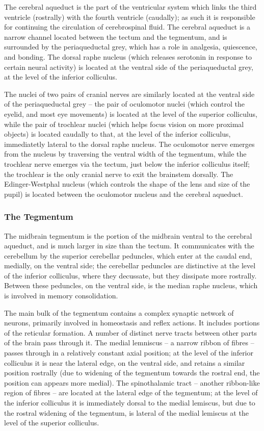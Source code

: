 The cerebral aqueduct is the part of the ventricular system which links the third ventricle (rostrally) with the fourth ventricle (caudally); as such it is responsible for continuing the circulation of cerebrospinal fluid. The cerebral aqueduct is a narrow channel located between the tectum and the tegmentum, and is surrounded by the periaqueductal grey, which has a role in analgesia, quiescence, and bonding. The dorsal raphe nucleus (which releases serotonin in response to certain neural activity) is located at the ventral side of the periaqueductal grey, at the level of the inferior colliculus.

The nuclei of two pairs of cranial nerves are similarly located at the ventral side of the periaqueductal grey -- the pair of oculomotor nuclei (which control the eyelid, and most eye movements) is located at the level of the superior colliculus, while the pair of trochlear nuclei (which helps focus vision on more proximal objects) is located caudally to that, at the level of the inferior colliculus, immediatetly lateral to the dorsal raphe nucleus. The oculomotor nerve emerges from the nucleus by traversing the ventral width of the tegmentum, while the trochlear nerve emerges via the tectum, just below the inferior colliculus itself; the trochlear is the only cranial nerve to exit the brainstem dorsally. The Edinger-Westphal nucleus (which controls the shape of the lens and size of the pupil) is located between the oculomotor nucleus and the cerebral aqueduct.

\hypertarget{the-tegmentum}{%
\subsubsection{The Tegmentum}\label{the-tegmentum}}

The midbrain tegmentum is the portion of the midbrain ventral to the cerebral aqueduct, and is much larger in size than the tectum. It communicates with the cerebellum by the superior cerebellar peduncles, which enter at the caudal end, medially, on the ventral side; the cerebellar peduncles are distinctive at the level of the inferior colliculus, where they decussate, but they dissipate more rostrally. Between these peduncles, on the ventral side, is the median raphe nucleus, which is involved in memory consolidation.

The main bulk of the tegmentum contains a complex synaptic network of neurons, primarily involved in homeostasis and reflex actions. It includes portions of the reticular formation. A number of distinct nerve tracts between other parts of the brain pass through it. The medial lemniscus -- a narrow ribbon of fibres -- passes through in a relatively constant axial position; at the level of the inferior colliculus it is near the lateral edge, on the ventral side, and retains a similar position rostrally (due to widening of the tegmentum towards the rostral end, the position can appears more medial). The spinothalamic tract -- another ribbon-like region of fibres -- are located at the lateral edge of the tegmentum; at the level of the inferior colliculus it is immediately dorsal to the medial lemiscus, but due to the rostral widening of the tegmentum, is lateral of the medial lemiscus at the level of the superior colliculus.

